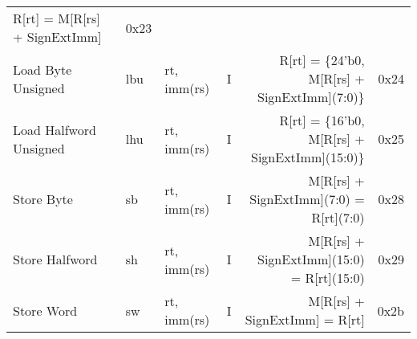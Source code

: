 \begin{tabularx}{\textwidth}{lMAcDr}
    R[rt] = M[R[rs] + SignExtImm]                  \footnotemark[2]                 & 0x23                         \\
    Load Byte Unsigned                                                              & lbu    & rt, imm(rs)   & I &
    R[rt] = \{24'b0, M[R[rs] + SignExtImm](7:0)\}  \footnotemark[2]                 & 0x24                         \\
    Load Halfword Unsigned                                                          & lhu    & rt, imm(rs)   & I &
    R[rt] = \{16'b0, M[R[rs] + SignExtImm](15:0)\} \footnotemark[2]                 & 0x25                         \\
    Store Byte                                                                      & sb     & rt, imm(rs)   & I &
    M[R[rs] + SignExtImm](7:0) = R[rt](7:0)        \footnotemark[2]                 & 0x28                         \\
    Store Halfword                                                                  & sh     & rt, imm(rs)   & I &
    M[R[rs] + SignExtImm](15:0) = R[rt](15:0)      \footnotemark[2]                 & 0x29                         \\
    Store Word                                                                      & sw     & rt, imm(rs)   & I &
    M[R[rs] + SignExtImm] = R[rt]                  \footnotemark[2]                 & 0x2b                         \\
    \bottomrule
\end{tabularx}

\begin{minipage}[t]{\linewidth-4em}
    \begin{multicols}{2}
        \small
            \\
         \\
            \\
         \\
            \\
    \end{multicols}
\end{minipage}

